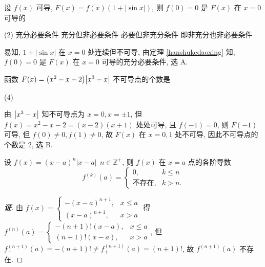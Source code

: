\begin{example}[1995 数一]
    设 $f(x)$ 可导, $F(x)=f(x)(1+|\sin x|)$, 则 $f(0)=0$ 是 $F(x)$ 在 $x=0$ 可导的
    \begin{tasks}(2)
        \task 充分必要条件
        \task 充分但非必要条件
        \task 必要但非充分条件
        \task 即非充分也非必要条件
    \end{tasks}
\end{example}
\begin{solution}
    易知, $1+|\sin x|$ 在 $x=0$ 处连续但不可导, 由定理 \ref{hanshukedaoxing} 知, $f(0)=0$ 是 $F(x)$ 在 $x=0$ 可导的充分必要条件, 选 A.
\end{solution}

\begin{example}[1998 数二]
    函数 $ F(x)=\qty(x^2-x-2)\qty|x^3-x| $ 不可导点的个数是
    \begin{tasks}(4)
    \end{tasks}
\end{example}
\begin{solution}
    由 $\qty|x^3-x|$ 知不可导点为 $x=0,x=\pm1$, 但 $f(x)=x^2-x-2=(x - 2) (x + 1)$ 处处可导, 且 $f(-1)=0$, 则 $F(-1)$ 可导, 
    但 $f(0)\neq 0,f(1)\neq 0$, 故 $F(x)$ 在 $x=0,1$ 处不可导, 因此不可导点的个数是 2, 选 B.
\end{solution}



\begin{theorem}
    设 $f(x)=(x-a)^{n}|x-a|~~n\in\mathbb{Z}^{+}$, 则 $f(x)$ 在 $x=a$ 点的各阶导数 $$f^{(k)}(a)=\begin{cases}
        0,&k\leqslant n\\\text{不存在},&k>n.
    \end{cases}$$
\end{theorem}
\begin{proof}[{\songti \textbf{证}}]
    由 $f(x)=\begin{cases}
        -(x-a)^{n+1},&x\leqslant a\\(x-a)^{n+1},&x>a
    \end{cases}$ 得 $f^{(n)}(a)=\begin{cases}
        -(n+1)!(x-a),&x\leqslant a\\ (n+1)!(x-a),&x>a
    \end{cases}$, 但 $f^{(n+1)}_-(a)=-(n+1)!\neq f^{(n+1)}_+(a)=(n+1)!$, 故 $f^{(n+1)}(a)$ 不存在.
\end{proof}

